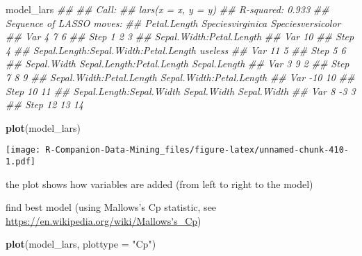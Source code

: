 \documentclass[
  notitlepage]{book}
\newenvironment{Shaded}{\begin{snugshade}}{\end{snugshade}}
\newcommand{\CommentTok}[1]{\textcolor[rgb]{0.56,0.35,0.01}{\textit{#1}}}
\newcommand{\DataTypeTok}[1]{\textcolor[rgb]{0.13,0.29,0.53}{#1}}
\newcommand{\KeywordTok}[1]{\textcolor[rgb]{0.13,0.29,0.53}{\textbf{#1}}}
\newcommand{\NormalTok}[1]{#1}
\newcommand{\StringTok}[1]{\textcolor[rgb]{0.31,0.60,0.02}{#1}}
\begin{document}
\begin{Shaded}
\begin{Highlighting}[]
\NormalTok{model\_lars}
\CommentTok{\#\# }
\CommentTok{\#\# Call:}
\CommentTok{\#\# lars(x = x, y = y)}
\CommentTok{\#\# R{-}squared: 0.933 }
\CommentTok{\#\# Sequence of LASSO moves:}
\CommentTok{\#\#      Petal.Length Speciesvirginica Speciesversicolor}
\CommentTok{\#\# Var             4                7                 6}
\CommentTok{\#\# Step            1                2                 3}
\CommentTok{\#\#      Sepal.Width:Petal.Length}
\CommentTok{\#\# Var                        10}
\CommentTok{\#\# Step                        4}
\CommentTok{\#\#      Sepal.Length:Sepal.Width:Petal.Length useless}
\CommentTok{\#\# Var                                     11       5}
\CommentTok{\#\# Step                                     5       6}
\CommentTok{\#\#      Sepal.Width Sepal.Length:Petal.Length Sepal.Length}
\CommentTok{\#\# Var            3                         9            2}
\CommentTok{\#\# Step           7                         8            9}
\CommentTok{\#\#      Sepal.Width:Petal.Length Sepal.Width:Petal.Length}
\CommentTok{\#\# Var                       {-}10                       10}
\CommentTok{\#\# Step                       10                       11}
\CommentTok{\#\#      Sepal.Length:Sepal.Width Sepal.Width Sepal.Width}
\CommentTok{\#\# Var                         8          {-}3           3}
\CommentTok{\#\# Step                       12          13          14}
\end{Highlighting}
\end{Shaded}

\begin{Shaded}
\begin{Highlighting}[]
\KeywordTok{plot}\NormalTok{(model\_lars)}
\end{Highlighting}
\end{Shaded}

\texttt{[image: R-Companion-Data-Mining\_files/figure-latex/unnamed-chunk-410-1.pdf]}

the plot shows how variables are added (from left to right to the model)

find best model (using Mallows's Cp statistic, see \url{https://en.wikipedia.org/wiki/Mallows's_Cp})

\begin{Shaded}
\begin{Highlighting}[]
\KeywordTok{plot}\NormalTok{(model\_lars, }\DataTypeTok{plottype =} \StringTok{"Cp"}\NormalTok{)}
\end{Highlighting}
\end{Shaded}
\end{document}
